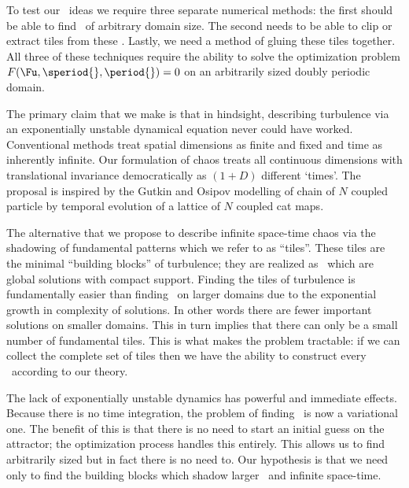 To test our \spt\ ideas we require three separate numerical methods: the first
should be able to find \twots\ of arbitrary domain size. The second needs to be able to
clip or extract tiles from these \twots. Lastly, we need a method of
gluing these tiles together. All three of these techniques require the ability
to solve the optimization problem $F(\Fu,\speriod{},\period{})=0$
on an arbitrarily sized doubly periodic domain.

The primary claim that we make is that in hindsight, describing turbulence
via an exponentially unstable dynamical equation never could have worked.
Conventional methods treat spatial dimensions
as finite and fixed and time as inherently infinite.
Our {\spt} formulation of chaos treats all continuous dimensions with translational
invariance democratically as $(1+D)$ different `times'.
The proposal is inspired by the Gutkin and Osipov
modelling of chain of $N$ coupled particle by temporal evolution of a
lattice of $N$ coupled cat maps.

The alternative that we propose to describe infinite space-time chaos via
the shadowing of fundamental patterns which we refer to as ``tiles''.
These tiles are the minimal ``building blocks'' of turbulence; they are realized
as \twots\ which are global solutions with compact support.
Finding the tiles of turbulence is fundamentally easier than finding
\twots\ on larger domains due to the exponential growth in complexity of
solutions. In other words there are fewer important solutions on smaller
domains. This in turn implies that there can only be a small
number of fundamental tiles. This is what makes the problem tractable:
if we can collect the complete set of tiles then we have the ability to
construct every \twot\ according to our theory.

The lack of exponentially unstable dynamics has powerful and immediate effects.
Because there is no time integration, the problem of finding \twots\ is
now a variational one. The benefit of this is that there is no need to start
an initial guess on the attractor; the optimization process handles this
entirely. This allows us to find arbitrarily sized \twots but in fact
there is no need to. Our hypothesis is that we need only to find the
building blocks which shadow larger \twots\ and infinite space-time.

